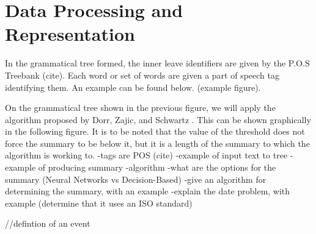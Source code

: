\section{Data Processing and Representation}
\par In the grammatical tree formed, the inner leave identifiers are given by the P.O.S Treebank (cite). Each word or set of words are given a part of speech tag identifying them. An example can be found below. (example figure).
\par On the grammatical tree shown in the previous figure, we will apply the algorithm proposed by Dorr, Zajic, and Schwartz \cite{dorrzajicschwartz2003}. This can be shown graphically in the following figure. It is to be noted that the value of the threshold does not force the summary to be below it, but it is a length of the summary to which the algorithm is working to.
-tags are POS (cite)
-example of input text to tree
-example of producing summary
-algorithm
-what are the options for the summary (Neural Networks vs Decision-Based)
-give an algorithm for determining the summary, with an example
-explain the date problem, with example (determine that it uses an ISO standard)



//defintion of an event

